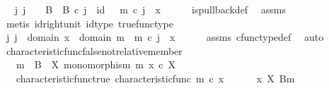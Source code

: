 \begin{isabellebody}
\ \isamarkupfalse%
\ {\isachardoublequoteopen}{\isasymexists}j{\isachardot}{\kern0pt}\ j\ {\isacharcolon}{\kern0pt}\ {\isasymone}\ {\isasymrightarrow}\ B\ {\isasymand}\ {\isasymbeta}\isactrlbsub B\isactrlesub \ {\isasymcirc}\isactrlsub c\ j\ {\isacharequal}{\kern0pt}\ id\ {\isasymone}\ {\isasymand}\ m\ {\isasymcirc}\isactrlsub c\ j\ {\isacharequal}{\kern0pt}\ x{\isachardoublequoteclose}\isanewline
\ \ \ \ \isamarkupfalse%
\ is{\isacharunderscore}{\kern0pt}pullback{\isacharunderscore}{\kern0pt}def\ \isamarkupfalse%
\ assms\ \isamarkupfalse%
\ {\isacharparenleft}{\kern0pt}metis\ id{\isacharunderscore}{\kern0pt}right{\isacharunderscore}{\kern0pt}unit{}\ id{\isacharunderscore}{\kern0pt}type\ true{\isacharunderscore}{\kern0pt}func{\isacharunderscore}{\kern0pt}type{\isacharparenright}{\kern0pt}\isanewline
\ \ \isamarkupfalse%
\ \isamarkupfalse%
\ {\isachardoublequoteopen}{\isasymexists}j{\isachardot}{\kern0pt}\ j\ {\isacharcolon}{\kern0pt}\ domain\ x\ {\isasymrightarrow}\ domain\ m\ {\isasymand}\ m\ {\isasymcirc}\isactrlsub c\ j\ {\isacharequal}{\kern0pt}\ x{\isachardoublequoteclose}\isanewline
\ \ \ \ \isamarkupfalse%
\ assms{\isacharparenleft}{\kern0pt}{}{\isacharcomma}{\kern0pt}{}{\isacharparenright}{\kern0pt}\ cfunc{\isacharunderscore}{\kern0pt}type{\isacharunderscore}{\kern0pt}def\ \isamarkupfalse%
\ auto\isanewline
{}\isamarkupfalse%
%
\endisatagproof
{\isafoldproof}%
%
\isadelimproof
\isanewline
%
\endisadelimproof
\isanewline
{}\isamarkupfalse%
\ characteristic{\isacharunderscore}{\kern0pt}func{\isacharunderscore}{\kern0pt}false{\isacharunderscore}{\kern0pt}not{\isacharunderscore}{\kern0pt}relative{\isacharunderscore}{\kern0pt}member{\isacharcolon}{\kern0pt}\isanewline
\ \ \ {\isachardoublequoteopen}m\ {\isacharcolon}{\kern0pt}\ B\ {\isasymrightarrow}\ X{\isachardoublequoteclose}\ {\isachardoublequoteopen}monomorphism\ m{\isachardoublequoteclose}\ {\isachardoublequoteopen}x\ {\isasymin}\isactrlsub c\ X{\isachardoublequoteclose}\isanewline
\ \ \ characteristic{\isacharunderscore}{\kern0pt}func{\isacharunderscore}{\kern0pt}true{\isacharcolon}{\kern0pt}\ {\isachardoublequoteopen}characteristic{\isacharunderscore}{\kern0pt}func\ m\ {\isasymcirc}\isactrlsub c\ x\ {\isacharequal}{\kern0pt}\ {\isasymf}{\isachardoublequoteclose}\isanewline
\ \ \ {\isachardoublequoteopen}{\isasymnot}\ {\isacharparenleft}{\kern0pt}x\ {\isasymin}\isactrlbsub X\isactrlesub \ {\isacharparenleft}{\kern0pt}B{\isacharcomma}{\kern0pt}m{\isacharparenright}{\kern0pt}{\isacharparenright}{\kern0pt}{\isachardoublequoteclose}\isanewline

\end{isabellebody}
